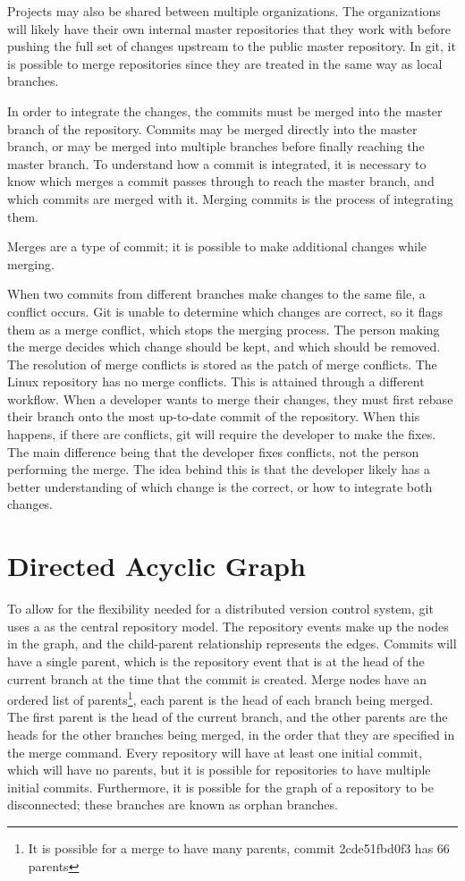 Projects may also be shared between multiple organizations.
The organizations will likely have their own internal master
repositories that they work with before pushing the full set of
changes upstream to the public master repository.
In git, it is possible to merge repositories since they are treated in
the same way as local branches.

In order to integrate the changes, the commits must be merged into the
master branch of the repository.
Commits may be merged directly into the master branch, or may be merged
into multiple branches before finally reaching the master branch.
To understand how a commit is integrated, it is necessary to know which
merges a commit passes through to reach the master branch, and which
commits are merged with it.
Merging commits is the process of integrating them.

Merges are a type of commit; it is possible to make additional
changes while merging.

When two commits from different branches make changes to the same file,
a conflict occurs.
Git is unable to determine which changes are correct, so it flags them
as a merge conflict, which stops the merging process.
The person making the merge decides which change should be kept,
and which should be removed.
The resolution of merge conflicts is stored as the patch of merge
conflicts.
The Linux repository has no merge conflicts.
This is attained through a different workflow.
When a developer wants to merge their changes, they must first rebase
their branch onto the most up-to-date commit of the repository.
When this happens, if there are conflicts, git will require
the developer to make the fixes.
The main difference being that the developer fixes conflicts,
not the person performing the merge.
The idea behind this is that the developer likely has a better
understanding of which change is the correct, or how to integrate both
changes.

\section{Directed Acyclic Graph}
\label{sec:directed_acyclic_graph}

To allow for the flexibility needed for a distributed version control
system, git uses a  as the central
repository model.
The repository events make up the nodes in the graph, and the
child-parent relationship represents the edges.
Commits will have a single parent, which is the repository event that
is at the head of the current branch at the time that the commit
is created.
Merge nodes have an ordered list of
parents\footnote{It is possible for a merge to have many parents, commit
  2cde51fbd0f3 has 66 parents},
each parent is the head of each branch being merged.
The first parent is the head of the current branch, and the other
parents are the heads for the other branches being merged, in the order
that they are specified in the merge command.
Every repository will have at least one initial commit, which
will have no parents, but it is possible for repositories to have
multiple initial commits.
Furthermore, it is possible for the graph of a repository to be
disconnected; these branches are known as orphan branches.

